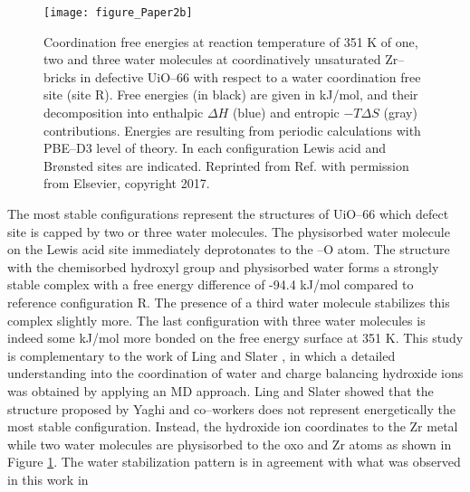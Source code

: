 \begin{figure}[!htp]
	\centering
	\texttt{[image: figure\_Paper2b]}
	\caption[Coordination free energies at reaction temperature of 351 K of one,
	two and three water molecules at coordinatively unsaturated Zr--bricks in
	defective UiO--66 with respect to a water coordination free site (site R). Free
	energies (in black) are given in kJ/mol, and their decomposition into enthalpic
	$\Delta H$ (blue) and entropic $-T \Delta S$ (gray) contributions. Energies
	are resulting from periodic calculations with PBE--D3 level of theory. In each
	configuration Lewis acid and Br\o{}nsted sites are indicated.]{Coordination free energies at reaction temperature of 351 K of one,
	two and three water molecules at coordinatively unsaturated Zr--bricks in
	defective UiO--66 with respect to a water coordination free site (site R). Free
	energies (in black) are given in kJ/mol, and their decomposition into enthalpic
	$\Delta H$ (blue) and entropic $-T \Delta S$ (gray) contributions. Energies
	are resulting from periodic calculations with PBE--D3 level of theory. In each
	configuration Lewis acid and Br\o{}nsted sites are indicated. Reprinted from
	Ref. \cite{Caratelli2017} with permission from Elsevier, copyright 2017.}
	\label{fig:figure_Paper2b}
\end{figure}
\npar
\newpage
The most stable configurations represent the structures of UiO--66 which defect
site is capped by two or three water molecules. The physisorbed water molecule
on the Lewis acid site immediately deprotonates to the --O atom.  
The structure with the chemisorbed hydroxyl group and physisorbed water forms a
strongly stable complex with a free energy difference of -94.4 kJ/mol compared
to reference configuration R. The presence of a third water molecule stabilizes 
this complex slightly more. The last configuration with three water molecules is
indeed some kJ/mol more bonded on the free energy surface at 351 K. This study
is complementary to the work of Ling and Slater \cite{Ling2016}, in which a
detailed understanding into the coordination of water and charge balancing hydroxide ions was obtained by applying an MD approach.
Ling and Slater \cite{Ling2016} showed that the structure proposed by Yaghi and
co--workers \cite{Trickett2015} does not represent energetically the most stable
configuration.
Instead, the hydroxide ion coordinates to the Zr metal while two water molecules
are physisorbed to the oxo and Zr atoms as shown in Figure \ref {fig:figure_Paper2b}. The water stabilization pattern is in agreement with what was observed in this work in
